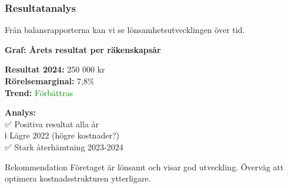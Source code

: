 \documentclass[10pt]{beamer}
\begin{document}
\begin{frame}[label=resultat]
  \frametitle{Resultatanalys}
  \small
  Från balansrapporterna kan vi se lönsamhetsutvecklingen över tid.
  
  \vspace{0.5cm}
  \begin{center}
    \textbf{Graf: Årets resultat per räkenskapsår}\\
    \vspace{0.3cm}
  \end{center}
  
  \vspace{0.5cm}
  \begin{minipage}{0.48\textwidth}
    \textbf{Resultat 2024:} 250 000 kr\\
    \textbf{Rörelsemarginal:} 7,8\%\\
    \textbf{Trend:} \textcolor{green}{Förbättras}
  \end{minipage}
  \hfill
  \begin{minipage}{0.48\textwidth}
    \textbf{Analys:}\\
    \footnotesize
    ✅ Positiva resultat alla år\\
    ℹ️ Lägre 2022 (högre kostnader?)\\
    ✅ Stark återhämtning 2023-2024
  \end{minipage}
  
  \vspace{0.5cm}
  \begin{block}{Rekommendation}
    Företaget är lönsamt och visar god utveckling. Överväg att optimera kostnadsstrukturen ytterligare.
  \end{block}
  
  \vspace{0.5cm}
  \begin{flushright}
    \hyperlink{nextslide}{}
  \end{flushright}
\end{frame}
\end{document}

